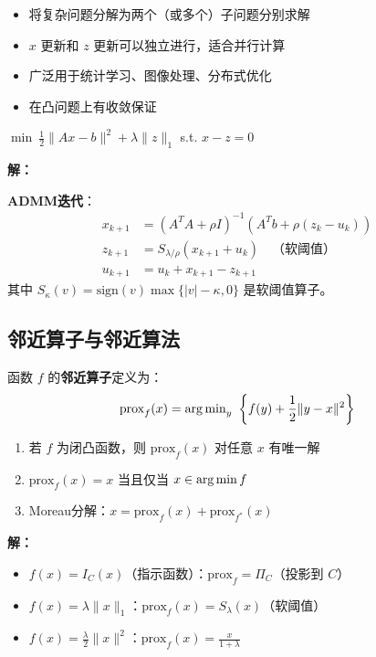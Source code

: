 \begin{notebox}[ADMM的特点]
\begin{itemize}[itemsep=0.3em]
    \item 将复杂问题分解为两个（或多个）子问题分别求解
    \item $x$ 更新和 $z$ 更新可以独立进行，适合并行计算
    \item 广泛用于统计学习、图像处理、分布式优化
    \item 在凸问题上有收敛保证
\end{itemize}
\end{notebox}

\begin{example}[LASSO的ADMM求解]
$\min\ \frac{1}{2}\|Ax - b\|^2 + \lambda\|z\|_1$ s.t. $x - z = 0$

\textbf{解：}

\textbf{ADMM迭代}：
\begin{align*}
x_{k+1} &= (A^T A + \rho I)^{-1}(A^T b + \rho(z_k - u_k)) \\
z_{k+1} &= S_{\lambda/\rho}(x_{k+1} + u_k) \quad \text{（软阈值）} \\
u_{k+1} &= u_k + x_{k+1} - z_{k+1}
\end{align*}
其中 $S_\kappa(v) = \text{sign}(v)\max\{|v| - \kappa, 0\}$ 是软阈值算子。
\end{example}

\subsection{邻近算子与邻近算法}

\begin{definition}
函数 $f$ 的\textbf{邻近算子}定义为：
\[
\text{prox}_f(x) = \operatorname{arg\,min}_y\ \left\{f(y) + \frac{1}{2}\|y - x\|^2\right\}
\]
\end{definition}

\begin{property}[邻近算子性质]
\begin{enumerate}[label=(\arabic*)]
    \item 若 $f$ 为闭凸函数，则 $\text{prox}_f(x)$ 对任意 $x$ 有唯一解
    \item $\text{prox}_f(x) = x$ 当且仅当 $x \in \operatorname{arg\,min} f$
    \item Moreau分解：$x = \text{prox}_f(x) + \text{prox}_{f^*}(x)$
\end{enumerate}
\end{property}

\begin{example}[常见邻近算子]
\textbf{解：}

\begin{itemize}[itemsep=0.3em]
    \item $f(x) = I_C(x)$（指示函数）：$\text{prox}_f = \Pi_C$（投影到 $C$）
    \item $f(x) = \lambda\|x\|_1$：$\text{prox}_f(x) = S_\lambda(x)$（软阈值）
    \item $f(x) = \frac{\lambda}{2}\|x\|^2$：$\text{prox}_f(x) = \frac{x}{1+\lambda}$
\end{itemize}
\end{example}

